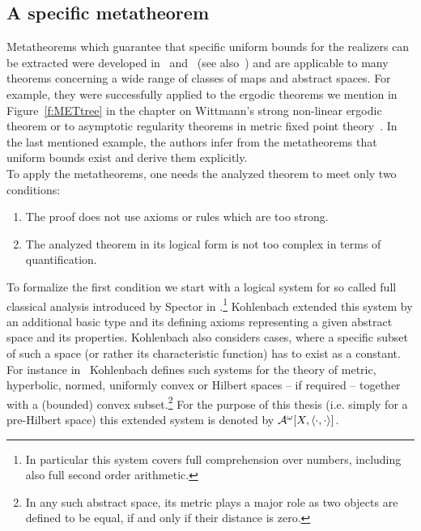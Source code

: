 \subsection{A specific metatheorem}
%
%
%
Metatheorems which guarantee that specific uniform bounds for the realizers
can be extracted were developed in~\cite{Kohlenbach05meta} and~\cite{GK08} (see also~\cite{Kohlenbach08})
and are applicable to many theorems concerning a wide range of classes of maps and abstract spaces. 
For example, they were successfully applied to 
the ergodic theorems we mention in Figure~\ref{f:METtree} in the chapter on Wittmann's strong
non-linear ergodic theorem or to 
asymptotic regularity theorems in metric fixed point theory~\cite{kohlenbachleustean10}.
In the last mentioned example, %
the authors infer from the metatheorems that uniform bounds exist and derive them explicitly.\\
To apply the metatheorems, one needs the analyzed theorem to meet only two conditions:
\begin{enumerate}
\item The proof does not use axioms or rules which are too strong.
\item The analyzed theorem in its logical form is not too complex in terms of quantification.
\end{enumerate}
To formalize the first condition we start with a logical system for so called full classical analysis
introduced by Spector in \cite{Spector62}.\footnote{In particular this system covers full comprehension
over numbers, including also full second order arithmetic.} Kohlenbach
extended this system by an additional basic type and its defining axioms representing a given abstract space
and its properties. Kohlenbach also considers cases, where a specific subset of such a space 
(or rather its characteristic function) has to exist as a constant. For instance in~\cite{Kohlenbach08} Kohlenbach defines 
such systems for the theory of metric, hyperbolic, normed, uniformly convex or Hilbert spaces -- 
if required -- together with a (bounded) convex subset.\footnote{In any such abstract space,
its metric plays a major role as two objects are defined to be equal, if and only if their 
distance is zero.} For the purpose of this thesis (i.e. simply for a pre-Hilbert space) this extended system is denoted by $\mathcal{A}^\omega[X,\langle\cdot,\cdot\rangle]$.
